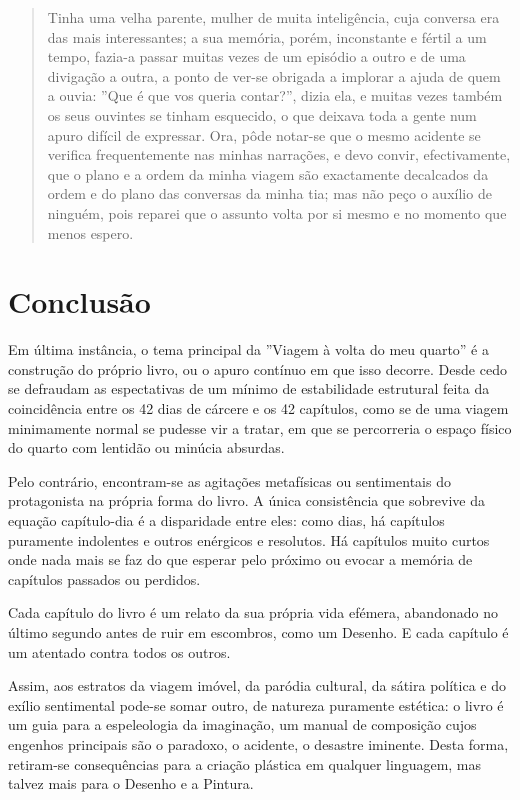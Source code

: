 \documentclass[12pt]{article}
\newenvironment{citacao}
{\begin{quote}
    \begin{small}
      \itshape
      \linespread{1}
}
{\end{small}\end{quote}}
\begin{document}
\singlespacing

\begin{citacao}
  Tinha uma velha parente, mulher de muita inteligência, cuja conversa
  era das mais interessantes; a sua memória, porém, inconstante e
  fértil a um tempo, fazia-a passar muitas vezes de um episódio a
  outro e de uma divigação a outra, a ponto de ver-se obrigada a
  implorar a ajuda de quem a ouvia: ''Que é que vos queria contar?'',
  dizia ela, e muitas vezes também os seus ouvintes se tinham
  esquecido, o que deixava toda a gente num apuro difícil de
  expressar. Ora, pôde notar-se que o mesmo acidente se verifica
  frequentemente nas minhas narrações, e devo convir, efectivamente,
  que o plano e a ordem da minha viagem são exactamente decalcados da
  ordem e do plano das conversas da minha tia; mas não peço o auxílio
  de ninguém, pois reparei que o assunto volta por si mesmo e no
  momento que menos espero.
\end{citacao}

\doublespacing

\section{Conclusão}

Em última instância, o tema principal da ''Viagem à volta do meu
quarto'' é a construção do próprio livro, ou o apuro contínuo em que
isso decorre. Desde cedo se defraudam as espectativas de um mínimo de
estabilidade estrutural feita da coincidência entre os 42 dias de
cárcere e os 42 capítulos, como se de uma viagem minimamente normal se
pudesse vir a tratar, em que se percorreria o espaço físico do quarto
com lentidão ou minúcia absurdas.

Pelo contrário, encontram-se as agitações metafísicas ou sentimentais
do protagonista na própria forma do livro. A única consistência que
sobrevive da equação capítulo-dia é a disparidade entre eles: como
dias, há capítulos puramente indolentes e outros enérgicos e
resolutos. Há capítulos muito curtos onde nada mais se faz do que
esperar pelo próximo ou evocar a memória de capítulos passados ou
perdidos.

Cada capítulo do livro é um relato da sua própria vida efémera,
abandonado no último segundo antes de ruir em escombros, como um
Desenho. E cada capítulo é um atentado contra todos os outros.

Assim, aos estratos da viagem imóvel, da paródia cultural, da sátira
política e do exílio sentimental pode-se somar outro, de natureza
puramente estética: o livro é um guia para a espeleologia da
imaginação, um manual de composição cujos engenhos principais são o
paradoxo, o acidente, o desastre iminente. Desta forma, retiram-se
consequências para a criação plástica em qualquer linguagem, mas
talvez mais para o Desenho e a Pintura.
\end{document}
